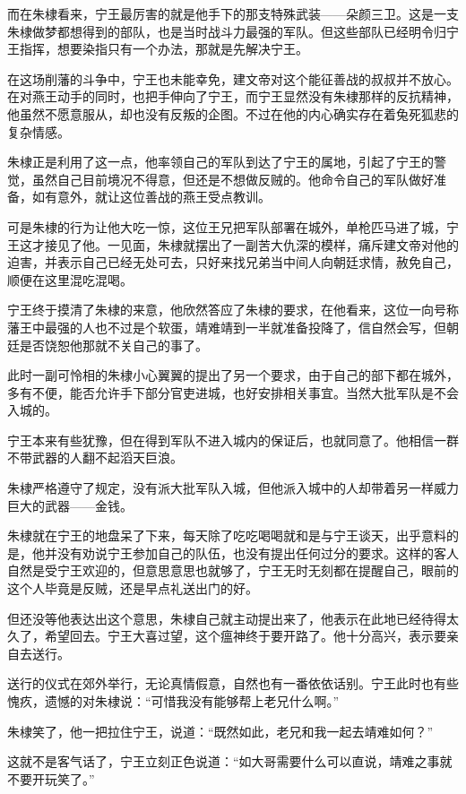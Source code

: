 \begin{multicols}{\theparacolNo}
		而在朱棣看来，宁王最厉害的就是他手下的那支特殊武装——朵颜三卫。这是一支朱棣做梦都想得到的部队，也是当时战斗力最强的军队。但这些部队已经明令归宁王指挥，想要染指只有一个办法，那就是先解决宁王。

		在这场削藩的斗争中，宁王也未能幸免，建文帝对这个能征善战的叔叔并不放心。在对燕王动手的同时，也把手伸向了宁王，而宁王显然没有朱棣那样的反抗精神，他虽然不愿意服从，却也没有反叛的企图。不过在他的内心确实存在着兔死狐悲的复杂情感。

		朱棣正是利用了这一点，他率领自己的军队到达了宁王的属地，引起了宁王的警觉，虽然自己目前境况不得意，但还是不想做反贼的。他命令自己的军队做好准备，如有意外，就让这位善战的燕王受点教训。

		可是朱棣的行为让他大吃一惊，这位王兄把军队部署在城外，单枪匹马进了城，宁王这才接见了他。一见面，朱棣就摆出了一副苦大仇深的模样，痛斥建文帝对他的迫害，并表示自己已经无处可去，只好来找兄弟当中间人向朝廷求情，赦免自己，顺便在这里混吃混喝。

		宁王终于摸清了朱棣的来意，他欣然答应了朱棣的要求，在他看来，这位一向号称藩王中最强的人也不过是个软蛋，靖难靖到一半就准备投降了，信自然会写，但朝廷是否饶恕他那就不关自己的事了。

		此时一副可怜相的朱棣小心翼翼的提出了另一个要求，由于自己的部下都在城外，多有不便，能否允许手下部分官吏进城，也好安排相关事宜。当然大批军队是不会入城的。

		宁王本来有些犹豫，但在得到军队不进入城内的保证后，也就同意了。他相信一群不带武器的人翻不起滔天巨浪。

		朱棣严格遵守了规定，没有派大批军队入城，但他派入城中的人却带着另一样威力巨大的武器——金钱。

		朱棣就在宁王的地盘呆了下来，每天除了吃吃喝喝就和是与宁王谈天，出乎意料的是，他并没有劝说宁王参加自己的队伍，也没有提出任何过分的要求。这样的客人自然是受宁王欢迎的，但意思意思也就够了，宁王无时无刻都在提醒自己，眼前的这个人毕竟是反贼，还是早点礼送出门的好。

		但还没等他表达出这个意思，朱棣自己就主动提出来了，他表示在此地已经待得太久了，希望回去。宁王大喜过望，这个瘟神终于要开路了。他十分高兴，表示要亲自去送行。

		送行的仪式在郊外举行，无论真情假意，自然也有一番依依话别。宁王此时也有些愧疚，遗憾的对朱棣说：“可惜我没有能够帮上老兄什么啊。”

		朱棣笑了，他一把拉住宁王，说道：“既然如此，老兄和我一起去靖难如何？”

		这就不是客气话了，宁王立刻正色说道：“如大哥需要什么可以直说，靖难之事就不要开玩笑了。”


\end{multicols}
